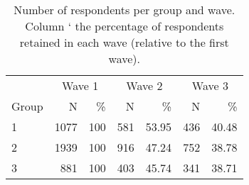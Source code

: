 \begin{table}[h]

\caption{\label{tab:t_a:panelmortality}Number of respondents per group and wave. Column `%
        the percentage of respondents retained in each wave (relative to the first wave).}
\centering
\begin{tabular}[t]{lrrrrrr}
\toprule
\multicolumn{1}{c}{ } & \multicolumn{2}{c}{Wave 1} & \multicolumn{2}{c}{Wave 2} & \multicolumn{2}{c}{Wave 3} \\
\cmidrule(l{3pt}r{3pt}){2-3} \cmidrule(l{3pt}r{3pt}){4-5} \cmidrule(l{3pt}r{3pt}){6-7}
Group & N & \% & N & \% & N & \%\\
\midrule
1 & 1077 & 100 & 581 & 53.95 & 436 & 40.48\\
2 & 1939 & 100 & 916 & 47.24 & 752 & 38.78\\
3 & 881 & 100 & 403 & 45.74 & 341 & 38.71\\
\bottomrule
\end{tabular}
\end{table}
